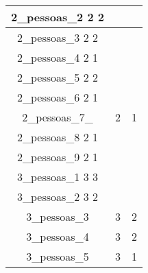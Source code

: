 \documentclass[12pt,oneside,a4paper,chapter=TITLE,section=TITLE,sumario=tradicional]{abntex2}
\begin{document}
\begin{quadro}[htb]
\begin{tabular}{|c|c|c|}
        2_pessoas_2	2	2 \\ \hline
        2_pessoas_3	2	2 \\ \hline
        2_pessoas_4	2	1 \\ \hline
        2_pessoas_5	2	2 \\ \hline
        2_pessoas_6	2	1 \\ \hline
        2_pessoas_7_ & 2 & 1 \\ \hline
        2_pessoas_8	2	1 \\ \hline
        2_pessoas_9	2	1 \\ \hline
        3_pessoas_1	3	3\\ \hline
        3_pessoas_2	3	2 \\ \hline
        3_pessoas_3	& 3 & 2 \\ \hline
        3_pessoas_4 & 3 & 2 \\ \hline
        3_pessoas_5 & 3 & 1 \\ \hline
    \end{tabular}
    
\end{quadro}





\end{document}
